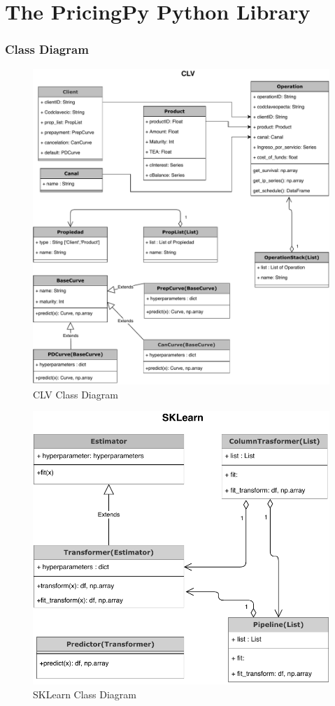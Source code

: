 

\chapter{The PricingPy Python Library}
\subsection{Class Diagram}

\begin{figure}[H]
  \centering
      \includegraphics[width=.8\textwidth]{diagrCLV.pdf} 
 \caption{CLV Class Diagram}
 \label{fig:Test}
\end{figure}

\begin{figure}[H]
  \centering
      \includegraphics[width=.8\textwidth]{diagrSklearn.pdf} 
 \caption{SKLearn Class Diagram}
 \label{fig:Test}
\end{figure}

